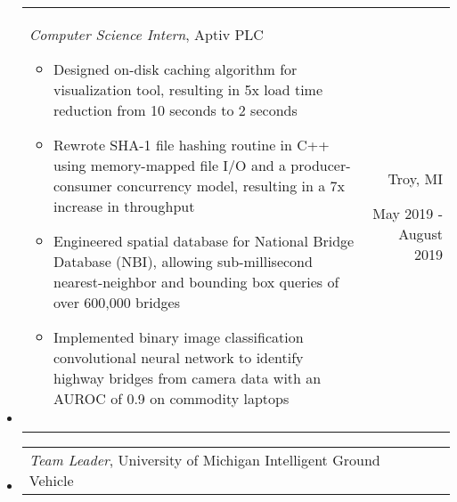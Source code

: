 \documentclass[9pt]{memoir}
\begin{document}
\begin{itemize}

\item

\begin{tabular}[t]{lr}

\begin{minipage}[t]{0.7 \textwidth}
\raggedright

\normalsize
\textit{Computer Science Intern}, Aptiv PLC

\small

\begin{itemize}
    \item Designed on-disk caching algorithm for visualization tool, resulting
          in 5x load time reduction from 10 seconds to 2 seconds
    \item Rewrote SHA-1 file hashing routine in C++ using memory-mapped file
          I/O and a producer-consumer concurrency model, resulting in a 7x
          increase in throughput
    \item Engineered spatial database for National Bridge Database (NBI),
          allowing sub-millisecond nearest-neighbor and bounding box queries of
          over 600,000 bridges
    \item Implemented binary image classification convolutional neural network
          to identify highway bridges from camera data with an AUROC of 0.9 on
          commodity laptops
\end{itemize}

\end{minipage}

&

\begin{minipage}[t]{0.2 \textwidth}
\raggedleft

\normalsize
Troy, MI

\small
May 2019 - August 2019
\end{minipage}

\\ \\

\end{tabular}

\item

\begin{tabular}[t]{lr}

\begin{minipage}[t]{0.7 \textwidth}
\raggedright

\normalsize
\textit{Team Leader}, University of Michigan Intelligent Ground Vehicle


\end{minipage}
\end{tabular}
\end{itemize}
\end{document}
